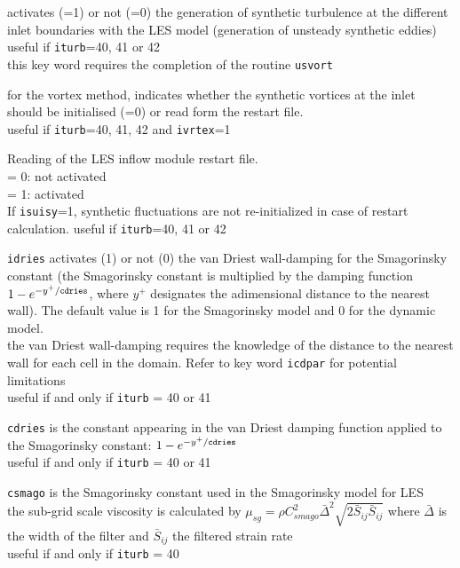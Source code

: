 
{activates (=1) or not (=0) the generation of synthetic turbulence at the
different inlet boundaries with the LES model (generation of unsteady synthetic
eddies)\\
useful if {\tt iturb}=40, 41 or 42\\
this key word requires the completion of the routine
\texttt{usvort}}

{for the vortex method, indicates whether the synthetic vortices at the inlet
should be initialised (=0) or read form the restart file.\\
useful if {\tt iturb}=40, 41, 42 and {\tt ivrtex}=1}

{Reading of the LES inflow module restart file.\\
\hspace*{1.3cm}= 0: not activated \\
\hspace*{1.3cm}= 1: activated\\
If {\tt isuisy}=1, synthetic fluctuations are not re-initialized in case of restart calculation.
useful if {\tt iturb}=40, 41 or 42
}

{{\tt idries} activates (1) or not (0) the van
Driest wall-damping for the Smagorinsky constant (the Smagorinsky
constant is multiplied by the damping function
$1-e^{-y^+/{\tt cdries}}$, where $y^+$ designates the adimensional
distance to the nearest wall). The default value is 1 for the
Smagorinsky model and 0 for the dynamic model.\\
the van Driest wall-damping requires the knowledge of the distance to the
nearest wall for each cell in the domain. Refer to key word {\tt icdpar}
for potential limitations\\
useful if and only if {\tt iturb} = 40 or 41}

{{\tt cdries} is the constant appearing in the
van Driest damping function applied to the Smagorinsky constant:
 $1-e^{-y^+/{\tt cdries}}$\\
useful if and only if {\tt iturb} = 40 or 41}

{{\tt csmago} is the Smagorinsky constant used in
the Smagorinsky model for LES\\
the sub-grid scale viscosity is calculated by
 $\displaystyle\mu_{sg}=\rho C_{smago}^2\bar{\Delta}^2\sqrt{2\bar{S}_{ij}\bar{S}_{ij}}$
where $\bar{\Delta}$ is the width of the filter and $\bar{S}_{ij}$ the filtered
strain rate\\
useful if and only if {\tt iturb} = 40}

